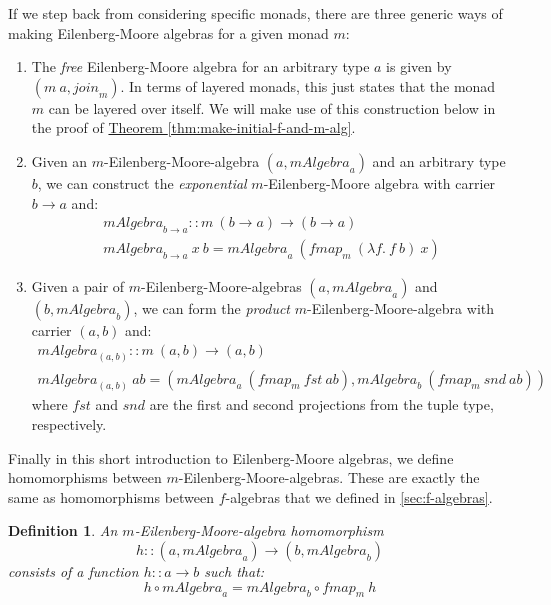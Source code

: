 \documentclass{jfp1}
\newtheorem{definition}{Definition}
\newcommand{\thmref}[1]{\hyperref[#1]{Theorem \ref*{#1}}}
\begin{document}
If we step back from considering specific monads, there are three
generic ways of making Eilenberg-Moore algebras for a given monad $m$:
\begin{enumerate}
\item The \emph{free} Eilenberg-Moore algebra for an arbitrary type
  $a$ is given by $(m~a, \mathit{join}_m)$. In terms of layered
  monads, this just states that the monad $m$ can be layered over
  itself. We will make use of this construction below in the proof of
  \thmref{thm:make-initial-f-and-m-alg}.
\item Given an $m$-Eilenberg-Moore-algebra $(a, \mathit{mAlgebra}_a)$
  and an arbitrary type $b$, we can construct the \emph{exponential}
  $m$-Eilenberg-Moore algebra with carrier $b \to a$ and:
  \begin{displaymath}
    \begin{array}{l}
      \mathit{mAlgebra}_{b \to a} :: m~(b \to a) \to (b \to a) \\
      \mathit{mAlgebra}_{b \to a}~x~b = \mathit{mAlgebra}_a~(\mathit{fmap}_m~(\lambda f.~f~b)~x)
    \end{array}
  \end{displaymath}
\item Given a pair of $m$-Eilenberg-Moore-algebras $(a,
  \mathit{mAlgebra}_a)$ and $(b, \mathit{mAlgebra}_b)$, we can form
  the \emph{product} $m$-Eilenberg-Moore-algebra with carrier $(a,b)$
  and:
  \begin{displaymath}
    \begin{array}{l}
      \mathit{mAlgebra}_{(a,b)} :: m~(a,b) \to (a,b) \\
      \mathit{mAlgebra}_{(a,b)}~\mathit{ab} = (\mathit{mAlgebra}_a~(\mathit{fmap}_m~\mathit{fst}~\mathit{ab}), \mathit{mAlgebra}_b~(\mathit{fmap}_m~\mathit{snd}~\mathit{ab}))
    \end{array}
  \end{displaymath}
  where $\mathit{fst}$ and $\mathit{snd}$ are the first and second
  projections from the tuple type, respectively.
\end{enumerate}

Finally in this short introduction to Eilenberg-Moore algebras, we
define homomorphisms between $m$-Eilenberg-Moore-algebras. These are
exactly the same as homomorphisms between $f$-algebras that we defined
in \autoref{sec:f-algebras}.

\begin{definition}
  An $m$-Eilenberg-Moore-algebra homomorphism
  \begin{displaymath}
    h :: (a, \mathit{mAlgebra}_a) \to (b, \mathit{mAlgebra}_b)
  \end{displaymath}
  consists of a function $h :: a \to b$ such that:
  \begin{equation}
    \label{eq:em-alg-homomorphism}
    h \circ \mathit{mAlgebra}_a = \mathit{mAlgebra}_b \circ \mathit{fmap}_m~h
  \end{equation}
\end{definition}
\end{document}
